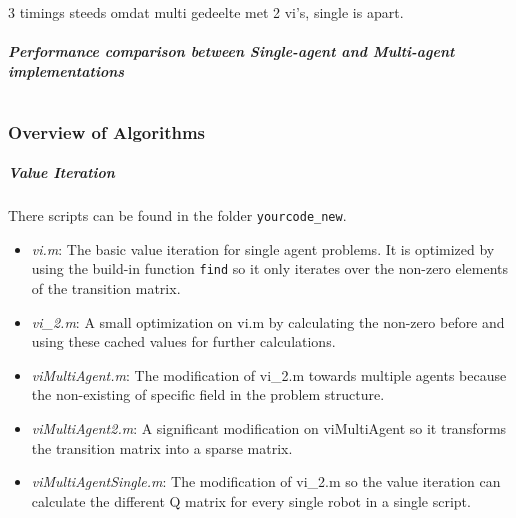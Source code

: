 \documentclass[10pt,a4paper]{article}
\begin{document}
3 timings steeds omdat multi gedeelte met 2 vi's, single is apart.

\subsubsection*{Performance comparison between Single-agent and Multi-agent implementations}





\part{}


\section{Overview of Algorithms}

\subsubsection*{Value Iteration}
There scripts can be found in the folder \texttt{yourcode\_new}.
\begin{itemize}
	\item \emph{vi.m}: The basic value iteration for single agent problems. It is optimized by using the build-in function \texttt{find} so it only iterates over the non-zero elements of the transition matrix.
	\item \emph{vi\_2.m}: A small optimization on vi.m by calculating the non-zero before and using these cached values for further calculations. 
	\item \emph{viMultiAgent.m}: The modification of vi\_2.m towards multiple agents because the non-existing of specific field in the problem structure.
	\item \emph{viMultiAgent2.m}: A significant modification on viMultiAgent so it transforms the transition matrix into a sparse matrix.
	\item \emph{viMultiAgentSingle.m}: The modification of vi\_2.m so the value iteration can calculate the different Q matrix for every single robot in a single script. 
	
\end{itemize}
\end{document}
